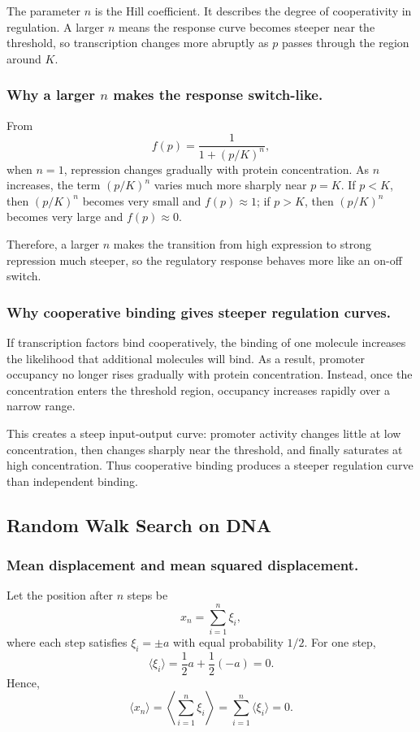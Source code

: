 \documentclass[12pt,a4paper]{article}
\begin{document}
The parameter $n$ is the Hill coefficient. It describes the degree of cooperativity in regulation. A larger $n$ means the response curve becomes steeper near the threshold, so transcription changes more abruptly as $p$ passes through the region around $K$.

\subsubsection{Why a larger \texorpdfstring{$n$}{n} makes the response switch-like.}
From
\[
  f(p)=\frac{1}{1+(p/K)^n},
\]
when $n=1$, repression changes gradually with protein concentration. As $n$ increases, the term $(p/K)^n$ varies much more sharply near $p=K$. If $p<K$, then $(p/K)^n$ becomes very small and $f(p)\approx 1$; if $p>K$, then $(p/K)^n$ becomes very large and $f(p)\approx 0$.

Therefore, a larger $n$ makes the transition from high expression to strong repression much steeper, so the regulatory response behaves more like an on-off switch.

\subsubsection{Why cooperative binding gives steeper regulation curves.}
If transcription factors bind cooperatively, the binding of one molecule increases the likelihood that additional molecules will bind. As a result, promoter occupancy no longer rises gradually with protein concentration. Instead, once the concentration enters the threshold region, occupancy increases rapidly over a narrow range.

This creates a steep input-output curve: promoter activity changes little at low concentration, then changes sharply near the threshold, and finally saturates at high concentration. Thus cooperative binding produces a steeper regulation curve than independent binding.

\subsection{Random Walk Search on DNA}

\subsubsection{Mean displacement and mean squared displacement.}
Let the position after $n$ steps be
\[
  x_n=\sum_{i=1}^{n}\xi_i,
\]
where each step satisfies $\xi_i=\pm a$ with equal probability $1/2$. For one step,
\[
  \langle \xi_i\rangle=\frac{1}{2}a+\frac{1}{2}(-a)=0.
\]
Hence,
\[
  \langle x_n\rangle=\left\langle \sum_{i=1}^{n}\xi_i\right\rangle=\sum_{i=1}^{n}\langle \xi_i\rangle=0.
\]
\end{document}
